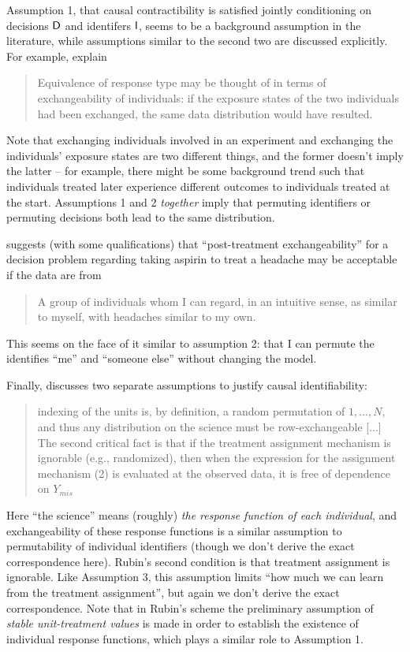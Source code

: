Assumption 1, that causal contractibility is satisfied jointly conditioning on decisions $\mathsf{D}$ and identifers $\mathsf{I}$, seems to be a background assumption in the literature, while assumptions similar to the second two are discussed explicitly. For example, \citet{greenland_identifiability_1986} explain
\begin{quote}
    Equivalence of response type may be thought of in terms of exchangeability of individuals: if the exposure states of the two individuals had been exchanged, the same data distribution would have resulted.
\end{quote}
Note that exchanging individuals involved in an experiment and exchanging the individuals' exposure states are two different things, and the former doesn't imply the latter -- for example, there might be some background trend such that individuals treated later experience different outcomes to individuals treated at the start. Assumptions 1 and 2 \emph{together} imply that permuting identifiers or permuting decisions both lead to the same distribution.

\citet{dawid_decision-theoretic_2020} suggests (with some qualifications) that ``post-treatment exchangeability'' for a decision problem regarding taking aspirin to treat a headache may be acceptable if the data are from
\begin{quote}
    A group of individuals whom I can regard, in an intuitive sense, as similar to myself, with headaches similar to my own.
\end{quote}
This seems on the face of it similar to assumption 2: that I can permute the identifies ``me'' and ``someone else'' without changing the model.

Finally, \citet{rubin_causal_2005} discusses two separate assumptions to justify causal identifiability:
\begin{quote}
    indexing of the units is, by definition, a random permutation of $1,..., N$, and thus any distribution on the science must be row-exchangeable [...] The second critical fact is that if the treatment assignment mechanism is ignorable (e.g., randomized), then when the expression for the assignment mechanism (2) is evaluated at the observed data, it is free of dependence on $Y_{mis}$
\end{quote}
Here ``the science'' means (roughly) \emph{the response function of each individual}, and exchangeability of these response functions is a similar assumption to permutability of individual identifiers (though we don't derive the exact correspondence here). Rubin's second condition is that treatment assignment is ignorable. Like Assumption 3, this assumption limits ``how much we can learn from the treatment assignment'', but again we don't derive the exact correspondence. Note that in Rubin's scheme the preliminary assumption of \emph{stable unit-treatment values} is made in order to establish the existence of individual response functions, which plays a similar role to Assumption 1. 


